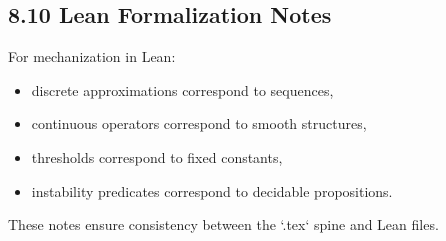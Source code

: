 \subsection*{8.10 Lean Formalization Notes}

For mechanization in Lean:
\begin{itemize}
\item discrete approximations correspond to sequences,
\item continuous operators correspond to smooth structures,
\item thresholds correspond to fixed constants,
\item instability predicates correspond to decidable propositions.
\end{itemize}

These notes ensure consistency between the `.tex` spine and Lean files.

